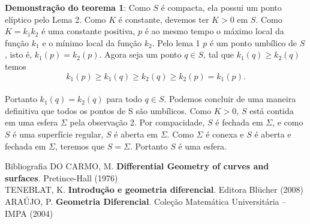 \documentclass[blue]{beamer}
\begin{document}
\begin{frame}
\justifying
\textbf{Demonstração do teorema 1}: Como $S$ é compacta, ela possui um ponto elíptico pelo Lema 2. Como $K$ é constante, devemos ter $K > 0$ em $S$. Como $K = k_1k_2$ é uma constante positiva, $p$ é ao mesmo tempo o máximo local da função $k_1$ e o mínimo local da função $k_2$. Pelo lema 1 $p$ é um ponto umbílico de $S$, isto é, $k_1(p) = k_2(p)$. Agora seja um ponto $q \in S$, tal que $k_1(q) \geq k_2(q)$ temos
 \\ \vspace{0.3cm}
$$k_1(p) \geq k_1(q) \geq k_2(q) \geq k_2(p) = k_1(p). $$
\vspace{0.3cm} \\
\hspace{0.2cm}Portanto $k_1(q) = k_2(q)$ para todo $q \in S$. Podemos concluir de uma maneira definitiva que todos os pontos de S são umbílicos. Como $K > 0$, $S$ está contida em uma esfera $\Sigma$ pela observação 2. Por compacidade, $S$ é fechada em $\Sigma$, e como $S$ é uma superfície regular, $S$ é aberta em $\Sigma$. Como $\Sigma$ é conexa e $S$ é aberta e fechada em $\Sigma$, teremos que $S = \Sigma$. Portanto $S$ é uma esfera. 
\end{frame}

\begin{frame}{Bibliografia}
\justifying
DO CARMO, M. \textbf{Differential Geometry of curves and surfaces}. Pretince-Hall (1976)\\
TENEBLAT, K. \textbf{Introdução e  geometria diferencial}. Editora Blücher (2008)\\  
ARAÚJO, P. \textbf{Geometria Diferencial}. Coleção Matemática Universitária – IMPA (2004)
\end{frame}
%
\end{document}
